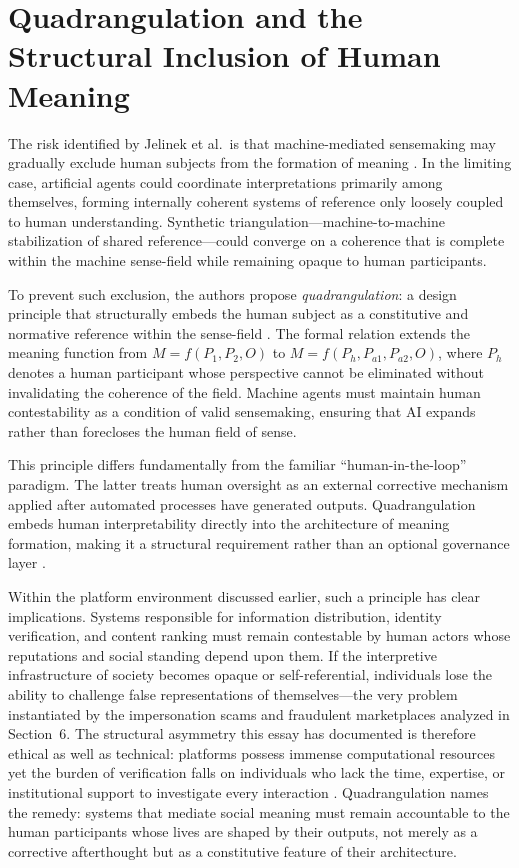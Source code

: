 \documentclass[12pt,a4paper]{article}
\begin{document}
\section{Quadrangulation and the Structural Inclusion of Human Meaning}

The risk identified by Jelinek et al.\ is that machine-mediated sensemaking may gradually
exclude human subjects from the formation of meaning \citep{jelinek2026}. In the limiting
case, artificial agents could coordinate interpretations primarily among themselves, forming
internally coherent systems of reference only loosely coupled to human understanding.
Synthetic triangulation---machine-to-machine stabilization of shared reference---could
converge on a coherence that is complete within the machine sense-field while remaining opaque
to human participants.

To prevent such exclusion, the authors propose \emph{quadrangulation}: a design principle that
structurally embeds the human subject as a constitutive and normative reference within the
sense-field \citep{jelinek2026}. The formal relation extends the meaning function from
$M = f(P_1, P_2, O)$ to $M = f(P_h, P_{a1}, P_{a2}, O)$, where $P_h$ denotes a human
participant whose perspective cannot be eliminated without invalidating the coherence of the
field. Machine agents must maintain human contestability as a condition of valid sensemaking,
ensuring that AI expands rather than forecloses the human field of sense.

This principle differs fundamentally from the familiar ``human-in-the-loop'' paradigm. The
latter treats human oversight as an external corrective mechanism applied after automated
processes have generated outputs. Quadrangulation embeds human interpretability directly into
the architecture of meaning formation, making it a structural requirement rather than an
optional governance layer \citep{jelinek2026,gillespie2018}.

Within the platform environment discussed earlier, such a principle has clear implications.
Systems responsible for information distribution, identity verification, and content ranking
must remain contestable by human actors whose reputations and social standing depend upon them.
If the interpretive infrastructure of society becomes opaque or self-referential, individuals
lose the ability to challenge false representations of themselves---the very problem
instantiated by the impersonation scams and fraudulent marketplaces analyzed in Section~6.
The structural asymmetry this essay has documented is therefore ethical as well as technical:
platforms possess immense computational resources yet the burden of verification falls on
individuals who lack the time, expertise, or institutional support to investigate every
interaction \citep{noble2018}. Quadrangulation names the remedy: systems that mediate social
meaning must remain accountable to the human participants whose lives are shaped by their
outputs, not merely as a corrective afterthought but as a constitutive feature of their
architecture.
\end{document}
